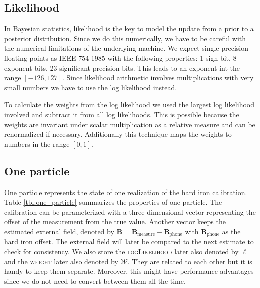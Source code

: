 \subsection{Likelihood}

In Bayesian statistics, likelihood is the key to model the update from a prior to a posterior distribution. Since we do this numerically, we have to be careful with the numerical limitations of the underlying machine. We expect single-precision floating-points as IEEE 754-1985 with the following properties: 1 sign bit, 8 exponent bits, 23 significant precision bits. This leads to an exponent int the range $[-126,127]$. Since likelihood arithmetic involves multiplications with very small numbers we have to use the log likelihood instead.

To calculate the weights from the log likelihood we used the largest log likelihood involved and subtract it from all log likelihoods. This is possible because the weights are invariant under scalar multiplication as a relative measure and can be renormalized if necessary. Additionally this technique maps the weights to numbers in the range $[0,1]$.

\subsection{One particle}

One particle represents the state of one realization of the hard iron calibration. Table \ref{tbl:one_particle} summarizes the properties of one particle. The calibration can be parameterized with a three dimensional vector representing the offset of the measurement from the true value. Another vector keeps the estimated external field, denoted by $\bm{B} = \bm{B}_\text{measure} - \bm{B}_\text{phone}$ with $\bm{B}_\text{phone}$ as the hard iron offset. The external field will later be compared to the next estimate to check for consistency. We also store the \textsc{logLikelihood} later also denoted by $\ell$ and the \textsc{weight} later also denoted by $\mathcal{W}$. They are related to each other but it is handy to keep them separate. Moreover, this might have performance advantages since we do not need to convert between them all the time.

